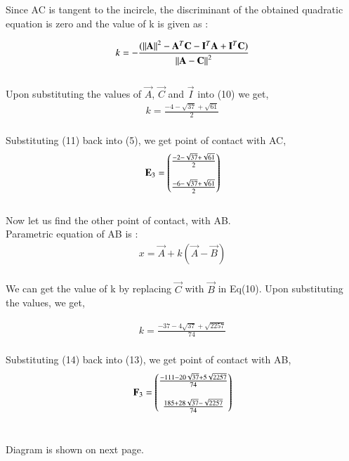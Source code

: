 \documentclass[journal,12pt,twocolumn]{IEEEtran}
\theoremstyle{remark}
\begin{document}
\begin{flushleft}
	Since AC is tangent to the incircle, the discriminant of the obtained quadratic equation is zero and the value of k is given as :

	\begin{align}
		k = -\frac{(\left\lVert\mathbf{A}\right\rVert^2 - {\mathbf{A}}^T \mathbf{C} - {\mathbf{I}}^T \mathbf{A} + {\mathbf{I}}^T \mathbf{C})}{\left\lVert\mathbf{A}-\mathbf{C}\right\rVert^2}
	\end{align}\\

	Upon substituting the values of $\vec{A}$, $\vec{C}$ and $\vec{I}$ into (10) we get,  
	\begin{align}
		k = \frac{-4-\sqrt{37}+\sqrt{61}}{2}
	\end{align}\\

	Substituting (11) back into (5), we get point of contact with AC,
	\begin{align}
		\mathbf{E}_3 = \begin{pmatrix}
			\frac{-2-\sqrt{37}+\sqrt{61}}{2}\\ \\
			\frac{-6-\sqrt{37}+\sqrt{61}}{2}
		\end{pmatrix}
	\end{align}\\

	\bigskip
	Now let us find the other point of contact, with AB.\\
	\bigskip
	Parametric equation of AB is : 
	\begin{align}
		x = \vec{A} + k(\vec{A}-\vec{B})
	\end{align}\\

	We can get the value of k by replacing $\vec{C}$ with $\vec{B}$ in Eq(10). Upon substituting the values, we get, 

	\begin{align}
		k = \frac{-37-4\sqrt{37}+\sqrt{2257}}{74}
	\end{align}\\

	Substituting (14) back into (13), we get point of contact with AB,
	\begin{align}
		\mathbf{F}_3 = \begin{pmatrix}
			\frac{-111-20\sqrt{37}+5\sqrt{2257}}{74}\\ \\
			\frac{185+28\sqrt{37}-\sqrt{2257}}{74}
		\end{pmatrix}
	\end{align}\\
	
	\bigskip

	Diagram is shown on next page.

\end{flushleft}
\end{document}
